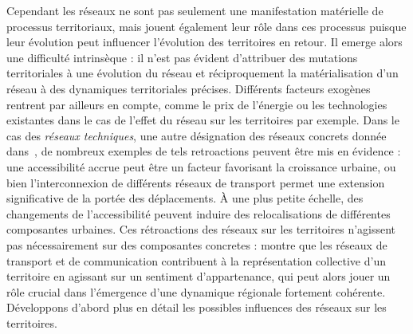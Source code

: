{Cependant les réseaux ne sont pas seulement une manifestation matérielle de processus territoriaux, mais jouent également leur rôle dans ces processus puisque leur évolution peut influencer l'évolution des territoires en retour. Il emerge alors une difficulté intrinsèque : il n'est pas évident d'attribuer des mutations territoriales à une évolution du réseau et réciproquement la matérialisation d'un réseau à des dynamiques territoriales précises. Différents facteurs exogènes rentrent par ailleurs en compte, comme le prix de l'énergie ou les technologies existantes dans le cas de l'effet du réseau sur les territoires par exemple. Dans le cas des \emph{réseaux techniques}, une autre désignation des réseaux concrets donnée dans~\cite{offner1996reseaux}, de nombreux exemples de tels retroactions peuvent être mis en évidence : une accessibilité accrue peut être un facteur favorisant la croissance urbaine, ou bien l'interconnexion de différents réseaux de transport permet une extension significative de la portée des déplacements. À une plus petite échelle, des changements de l'accessibilité peuvent induire des relocalisations de différentes composantes urbaines. Ces rétroactions des réseaux sur les territoires n'agissent pas nécessairement sur des composantes concretes : \cite{claval1987reseaux} montre que les réseaux de transport et de communication contribuent à la représentation collective d'un territoire en agissant sur un sentiment d'appartenance, qui peut alors jouer un rôle crucial dans l'émergence d'une dynamique régionale fortement cohérente. Développons d'abord plus en détail les possibles influences des réseaux sur les territoires.
}


